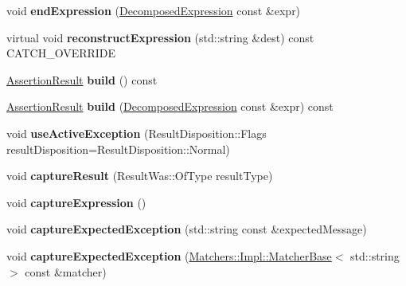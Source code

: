 \begin{DoxyCompactItemize}
void {\bfseries end\+Expression} (\hyperlink{structCatch_1_1DecomposedExpression}{Decomposed\+Expression} const \&expr)
\item 
\mbox{\label{classCatch_1_1ResultBuilder_a7d94b15cf04301a8617e7b16158b5d82}} 
virtual void {\bfseries reconstruct\+Expression} (std\+::string \&dest) const C\+A\+T\+C\+H\+\_\+\+O\+V\+E\+R\+R\+I\+DE
\item 
\mbox{\label{classCatch_1_1ResultBuilder_a4fc96e7bb8b5f7119a8e79692ec97808}} 
\hyperlink{classCatch_1_1AssertionResult}{Assertion\+Result} {\bfseries build} () const
\item 
\mbox{\label{classCatch_1_1ResultBuilder_a475d19a04c5d10a5a87cbb85447b59da}} 
\hyperlink{classCatch_1_1AssertionResult}{Assertion\+Result} {\bfseries build} (\hyperlink{structCatch_1_1DecomposedExpression}{Decomposed\+Expression} const \&expr) const
\item 
\mbox{\label{classCatch_1_1ResultBuilder_a5bbd2f14a678f3e8d0f791ac6d233d65}} 
void {\bfseries use\+Active\+Exception} (Result\+Disposition\+::\+Flags result\+Disposition=Result\+Disposition\+::\+Normal)
\item 
\mbox{\label{classCatch_1_1ResultBuilder_a10e467f7b7a4976e5d148b4d5066e8fd}} 
void {\bfseries capture\+Result} (Result\+Was\+::\+Of\+Type result\+Type)
\item 
\mbox{\label{classCatch_1_1ResultBuilder_af2ae2343965802eeeb0abbd4ea9d2d36}} 
void {\bfseries capture\+Expression} ()
\item 
\mbox{\label{classCatch_1_1ResultBuilder_a9ac96f6220c8dd8e4feee725c6228d77}} 
void {\bfseries capture\+Expected\+Exception} (std\+::string const \&expected\+Message)
\item 
\mbox{\label{classCatch_1_1ResultBuilder_a2d6a194258f07f212fef098c0201038a}} 
void {\bfseries capture\+Expected\+Exception} (\hyperlink{structCatch_1_1Matchers_1_1Impl_1_1MatcherBase}{Matchers\+::\+Impl\+::\+Matcher\+Base}$<$ std\+::string $>$ const \&matcher)

\end{DoxyCompactItemize}
